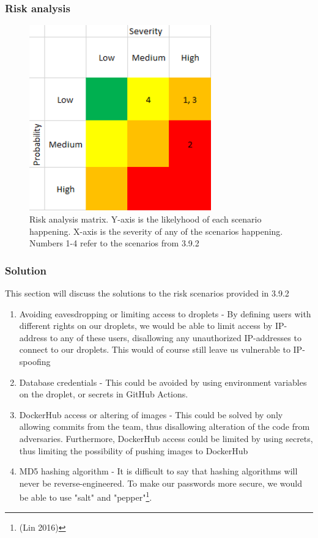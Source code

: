 \documentclass{article}
\begin{document}
\subsubsection{Risk analysis}
\begin{figure}[h!]
    \centering
    \includegraphics[width=0.7\textwidth]{images/risk-matrix.png}
    \caption{Risk analysis matrix. Y-axis is the likelyhood of each scenario happening. X-axis is the severity of any of the scenarios happening. Numbers 1-4 refer to the scenarios from 3.9.2}
\end{figure}
\subsubsection{Solution}
This section will discuss the solutions to the risk scenarios provided in 3.9.2
\begin{enumerate}
    \item Avoiding eavesdropping or limiting access to droplets - By defining users with different rights on our droplets, we would be able to limit access by IP-address to any of these users, disallowing any unauthorized IP-addresses to connect to our droplets. This would of course still leave us vulnerable to IP-spoofing
    \item Database credentials - This could be avoided by using environment variables on the droplet, or secrets in GitHub Actions. 
    \item DockerHub access or altering of images - This could be solved by only allowing commits from the team, thus disallowing alteration of the code from adversaries. Furthermore, DockerHub access could be limited by using secrets, thus limiting the possibility of pushing images to DockerHub 
    \item MD5 hashing algorithm - It is difficult to say that hashing algorithms will never be reverse-engineered. To make our passwords more secure, we would be able to use "salt" and "pepper"\footnote{(Lin 2016)}.
\end{enumerate}
\end{document}
